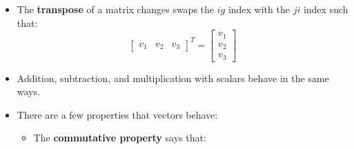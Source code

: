\begin{itemize}
\begin{center}
    \end{center}
    \item The \textbf{transpose} of a matrix changes swaps the $ig$ index with the $ji$ index such that:
    \begin{equation}
        \begin{bmatrix}
            v_1&v_2&v_3
        \end{bmatrix}^T = \begin{bmatrix}
            v_1\\v_2\\v_3
        \end{bmatrix}
        \label{eq:}
    \end{equation}
    \item Addition, subtraction, and multiplication with scalars behave in the same ways.
    \item There are a few properties that vectors behave:
        \begin{itemize}
            \item The \textbf{commutative property} says that:

\end{itemize}
\end{itemize}
